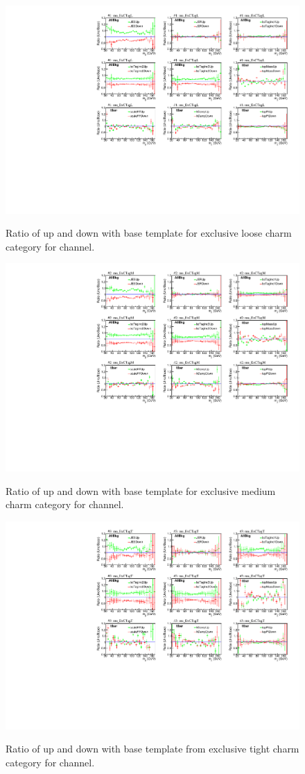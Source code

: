 \newpage
\begin{figure}
    \centering  
    {\includegraphics[width=0.80\linewidth]{Image/SYS/RatioBaseSys/mjj_1_mu_ExCTagL.pdf}}
    \caption{ Ratio of up and down with base template for exclusive loose charm category for \mujets channel. }
    \label{fig:shapeVslnN1}
\end{figure}


\begin{figure}
    \centering  
    {\includegraphics[width=0.80\linewidth]{Image/SYS/RatioBaseSys/mjj_2_mu_ExCTagM.pdf}}
    \caption{ Ratio of up and down with base template for exclusive medium charm category for \mujets channel.}
    \label{fig:shapeVslnN2}
\end{figure}
\begin{figure}
    \centering  
    {\includegraphics[width=0.80\linewidth]{Image/SYS/RatioBaseSys/mjj_3_mu_ExCTagT.pdf}}
    \caption{ Ratio of up and down with base template from  exclusive tight charm category for \mujets channel. }
    \label{fig:shapeVslnN3}
\end{figure}


